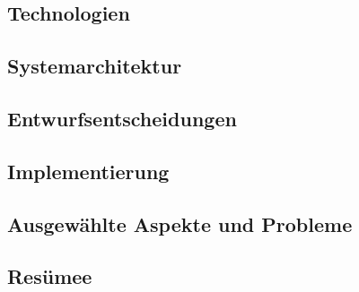 \documentclass[12pt,a4paper,titlepage,listof=totoc,bibliography=totoc,chapteratlists=0pt]{scrreprt}
\begin{document}
\begin{spacing}{1}
    \chapter{Technologien}\label{chapter:technologien}
\end{spacing}



\begin{spacing}{1}
    \chapter{Systemarchitektur}\label{chapter:system-architecture}
\end{spacing}


\begin{spacing}{1}
    \chapter{Entwurfsentscheidungen}\label{chapter:Entwurfsentscheidungen}
\end{spacing}


\begin{spacing}{1}
    \chapter{Implementierung}\label{chapter:implementation}
\end{spacing}


\begin{spacing}{1}
    \chapter{Ausgewählte Aspekte und Probleme}\label{chapter:probleme}
\end{spacing}


\begin{spacing}{1}
    \chapter{Resümee}
\end{spacing}


\setcounter{page}{\value{RPages}}

\glsnogroupskiptrue
\printglossary[title=Glossar,toctitle=Glossar] %
\listoffigures
\listoftables
\lstlistoflistings
\appendix
{}

\newpage
{}
\end{document}
